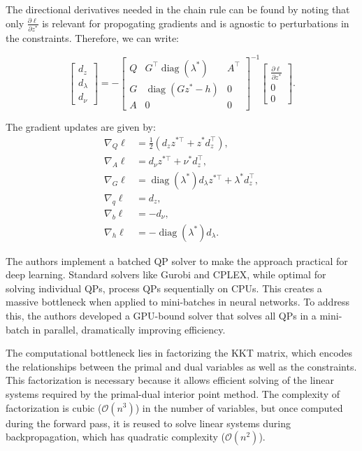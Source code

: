 \documentclass{article}
\DeclareMathOperator{\diag}{diag}
\begin{document}
The directional derivatives needed in the chain rule can be found by noting that only $\frac{\partial \ell}{\partial z^*}$ is relevant for propogating gradients and is agnostic to perturbations in the constraints. Therefore, we can write: 

\begin{equation}
\begin{bmatrix}
d_z \\
d_\lambda \\
d_\nu
\end{bmatrix}
=
-
\begin{bmatrix}
Q & G^\top \diag(\lambda^*) & A^\top \\
G & \diag(Gz^* - h) & 0 \\
A & 0 & 0
\end{bmatrix}^{-1}
\begin{bmatrix}
\frac{\partial \ell}{\partial z^*} \\
0 \\
0
\end{bmatrix}.
\end{equation}


The gradient updates are given by: 
\begin{equation}
    \begin{aligned}
        \nabla_Q \ell &= \frac{1}{2}\left(d_z z^{*\top} + z^* d_z^\top\right), \\
        \nabla_A \ell &= d_\nu z^{*\top} + \nu^* d_z^\top, \\
        \nabla_G \ell &= \diag(\lambda^*)d_\lambda z^{*\top} + \lambda^* d_z^\top, \\
        \nabla_q \ell &= d_z, \\
        \nabla_b \ell &= -d_\nu, \\
        \nabla_h \ell &= -\diag(\lambda^*) d_\lambda.
    \end{aligned}
\end{equation}

The authors implement a batched QP solver to make the approach practical for deep learning. Standard solvers like Gurobi and CPLEX, while optimal for solving individual QPs, process QPs sequentially on CPUs. This creates a massive bottleneck when applied to mini-batches in neural networks. To address this, the authors developed a GPU-bound solver that solves all QPs in a mini-batch in parallel, dramatically improving efficiency.

The computational bottleneck lies in factorizing the KKT matrix, which encodes the relationships between the primal and dual variables as well as the constraints. This factorization is necessary because it allows efficient solving of the linear systems required by the primal-dual interior point method. The complexity of factorization is cubic (\( \mathcal{O}(n^3) \)) in the number of variables, but once computed during the forward pass, it is reused to solve linear systems during backpropagation, which has quadratic complexity (\( \mathcal{O}(n^2) \)).
\end{document}

